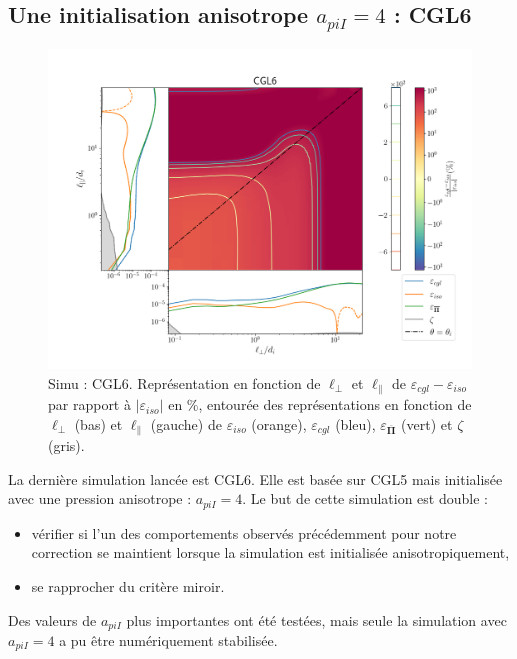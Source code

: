 \subsection{Une initialisation anisotrope $a_{piI} = 4$ : CGL6}
\begin{figure}[!ht]
 \centering
\includegraphics[width=0.95\linewidth,trim=1cm 1cm 0cm 2cm, clip=true]{./Mainmatter/Part_3/images_ch3/CGL6_panel_isocgl_percent}
\cprotect\caption{Simu : CGL6. Représentation  en fonction de \ensuremath{\ell_{\perp}} et \ensuremath{\ell_{\parallel}} de \ensuremath{\varepsilon_{cgl}-\varepsilon_{iso}} par rapport à \ensuremath{|\varepsilon_{iso}|} en \ensuremath{\%}, entourée des représentations  en fonction de \ensuremath{\ell_{\perp}} (bas) et \ensuremath{\ell_{\parallel}} (gauche) de \ensuremath{\varepsilon_{iso}} (orange), \ensuremath{\varepsilon_{cgl}} (bleu), \ensuremath{\varepsilon_{\overline{\boldsymbol{\Pi}}}} (vert) et \ensuremath{\zeta} (gris). }
\label{fig:trip_CGL6}
\end{figure}
La dernière simulation lancée est CGL6. Elle est basée sur CGL5 mais initialisée avec une pression anisotrope : $a_{piI} = 4 $. Le but de cette simulation est double :
\begin{itemize}
    \item vérifier si l'un des comportements observés précédemment pour notre correction se maintient lorsque la simulation est initialisée anisotropiquement,
    \item se rapprocher du critère miroir.
\end{itemize}
Des valeurs de $a_{piI}$ plus importantes ont été testées, mais seule la simulation avec $a_{piI} = 4 $ a pu être numériquement stabilisée. 

